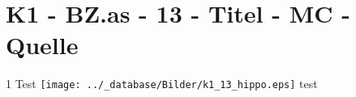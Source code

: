 \section{K1 - BZ.as - 13 - Titel - MC - Quelle}

\begin{langesbeispiel} \item[1] %
Test \texttt{[image: ../\_database/Bilder/k1\_13\_hippo.eps]} test
\end{langesbeispiel}